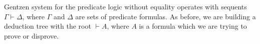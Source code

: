 

\setcounter{section}{2}
\setcounter{subsection}{2}
\setcounter{dfn}{3}

Gentzen system for the predicate logic without equality operates with sequents $\Gamma \vdash \Delta$,
where $\Gamma$ and $\Delta$ are sets of predicate formulas.
As before, we are building a deduction tree with the root $\vdash A$,
where $A$ is a formula which we are trying to prove or disprove.



